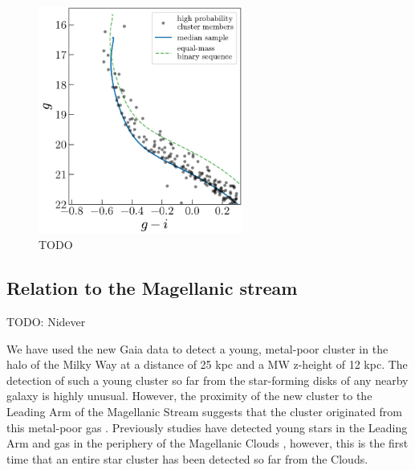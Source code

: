 \documentclass[modern]{aastex62}
\newcommand{\todo}[1]{{\color{red} TODO: #1}}
\newcommand{\vlsr}{$V_{\rm LSR}~$}
\newcommand{\hi}{H{\footnotesize I} }
\begin{document}
\begin{figure}
\centering
\includegraphics[width=0.6\textwidth]{figures/hierarch-results.pdf}
\caption{TODO}
\label{fig:hierarch-iso}
\end{figure}


\subsection{Relation to the Magellanic stream}
\label{sec:higas}

\todo{Nidever}

We have used the new Gaia data to detect a young, metal-poor cluster in the halo of the Milky Way at a distance of 25 kpc and a MW z-height of 12 kpc.  The detection of such a young cluster so far from the star-forming disks of any nearby
galaxy is highly unusual.  However, the proximity of the new cluster to the Leading Arm of the Magellanic Stream suggests
that the cluster originated from this metal-poor gas \citep{Fox:2018}.  Previously studies have detected young stars in the Leading Arm and gas in the periphery of the Magellanic Clouds \citep{Casetti-Dinescu:2014, MoniBidin:2017}, however, this is the first time that an entire star cluster has been detected so far from the Clouds.

\end{document}
